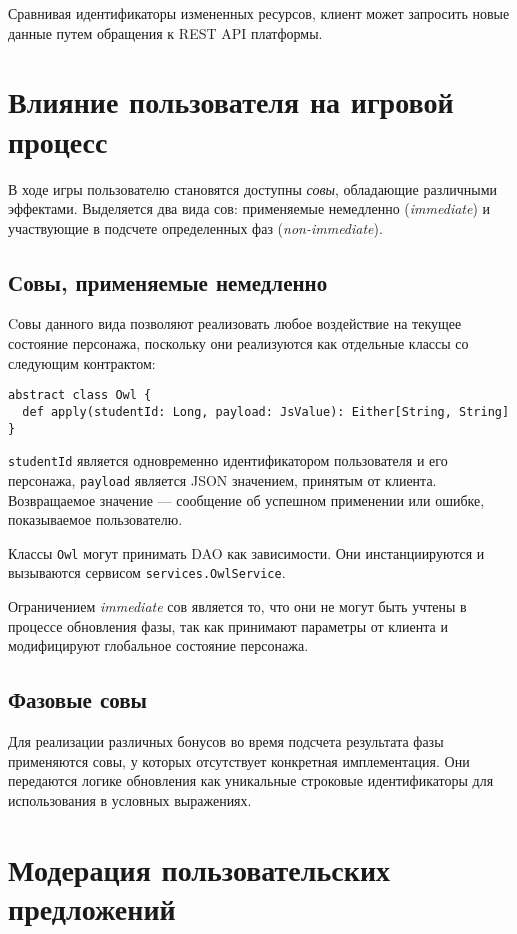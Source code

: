 \documentclass[12pt, a4paper]{article}
\begin{document}
Сравнивая идентификаторы измененных ресурсов, клиент может запросить новые данные
путем обращения к REST API платформы.

\section*{Влияние пользователя на игровой процесс}

В ходе игры пользователю становятся доступны \textit{совы}, обладающие различными эффектами.
Выделяется два вида сов: применяемые немедленно (\textit{immediate}) и участвующие в подсчете
определенных фаз (\textit{non-immediate}).

\subsection*{Совы, применяемые немедленно}

Cовы данного вида позволяют реализовать любое воздействие на текущее состояние
персонажа, поскольку они реализуются как отдельные классы со следующим контрактом:

\begin{verbatim}
abstract class Owl {
  def apply(studentId: Long, payload: JsValue): Either[String, String]
}
\end{verbatim}

\texttt{studentId} является одновременно идентификатором пользователя и его персонажа,
\texttt{payload} является JSON значением, принятым от клиента. Возвращаемое значение —
сообщение об успешном применении или ошибке, показываемое пользователю.

Классы \texttt{Owl} могут принимать DAO как зависимости. Они инстанциируются и вызываются
сервисом \texttt{services.OwlService}.

Ограничением \textit{immediate} сов является то, что они не могут быть учтены в процессе
обновления фазы, так как принимают параметры от клиента и модифицируют глобальное состояние
персонажа.

\subsection*{Фазовые совы}

Для реализации различных бонусов во время подсчета результата фазы применяются совы, у которых
отсутствует конкретная имплементация. Они передаются логике обновления как уникальные строковые идентификаторы
для использования в условных выражениях.

\section*{Модерация пользовательских предложений}
\end{document}
